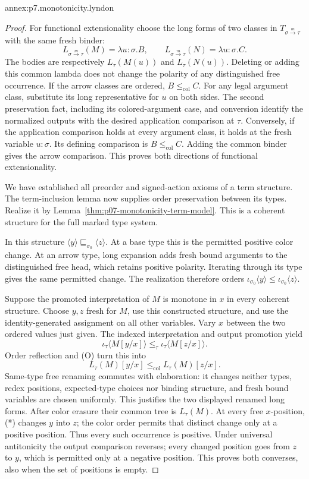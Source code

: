 \begin{annexitem}{annex:p7.monotonicity.lyndon}
\begin{proof}
For functional extensionality choose the long forms of two classes in
\(T_{\sigma\xrightarrow m\tau}\) with the same fresh binder:
\[
 L_{\sigma\xrightarrow m\tau}(M)=\lambda u:\sigma.B,\qquad
 L_{\sigma\xrightarrow m\tau}(N)=\lambda u:\sigma.C.
\]
The bodies are respectively \(L_\tau(M(u))\) and \(L_\tau(N(u))\).
Deleting or adding this common lambda does not change the polarity
of any distinguished free occurrence.
If the arrow classes are ordered, \(B\leq_{\mathrm{col}}C\).
For any legal argument class, substitute its long representative for
\(u\) on both sides. The second preservation fact, including its
colored-argument case, and conversion identify the normalized outputs
with the desired application comparison at \(\tau\).
Conversely, if the application comparison holds at every argument class,
it holds at the fresh variable \(u:\sigma\).
Its defining comparison is \(B\leq_{\mathrm{col}}C\).
Adding the common binder gives the arrow comparison.
This proves both directions of functional extensionality.

We have established all preorder and signed-action axioms of a term
structure. The term-inclusion lemma now supplies order preservation
between its types. Realize it by
Lemma~\ref{thm:p07-monotonicity-term-model}.
This is a coherent structure for the full marked type system.

In this structure
\(\langle y\rangle\sqsubseteq_{\sigma_0}\langle z\rangle\).
At a base type this is the permitted positive color change.
At an arrow type, long expansion adds fresh bound arguments to the
distinguished free head, which retains positive polarity.
Iterating through its type gives the same permitted change.
The realization therefore orders
\(\iota_{\sigma_0}\langle y\rangle\leq
  \iota_{\sigma_0}\langle z\rangle\).

Suppose the promoted interpretation of \(M\) is monotone in \(x\)
in every coherent structure. Choose \(y,z\) fresh for \(M\), use this
constructed structure, and use the identity-generated assignment on
all other variables. Vary \(x\) between the two ordered values just given.
The indexed interpretation and output promotion yield
\[
 \iota_\tau\langle M[y/x]\rangle
       \leq_\tau
 \iota_\tau\langle M[z/x]\rangle.
\]
Order reflection and (O) turn this into
\[
 L_\tau(M)[y/x]\leq_{\mathrm{col}}L_\tau(M)[z/x].
 \tag{*}
\]
Same-type free renaming commutes with elaboration: it changes neither
types, redex positions, expected-type choices nor binding structure,
and fresh bound variables are chosen uniformly.
This justifies the two displayed renamed long forms.
After color erasure their common tree is \(L_\tau(M)\).
At every free \(x\)-position, (*) changes \(y\) into \(z\);
the color order permits that distinct change only at a positive position.
Thus every such occurrence is positive.
Under universal antitonicity the output comparison reverses; every
changed position goes from \(z\) to \(y\), which is permitted only
at a negative position. This proves both converses, also when the
set of positions is empty.


\end{proof}
\end{annexitem}
